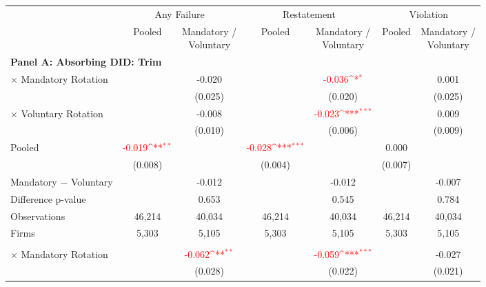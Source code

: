 \documentclass[10pt]{article}
\newcommand{\sym}[1]{\textsuperscript{#1}}
\begin{document}
\begin{minipage}{19cm}\fontsize{10}{12}\selectfont\setlength{\tabcolsep}{4pt}\renewcommand{\arraystretch}{1.12}


\def\sym#1{\ifmmode^{#1}\else\(^{#1}\)\fi}
\centering
{}
\label{tab:absorbing-transition-akm-restatement-good-downgrade-no-auditfirm-fe}
\begin{threeparttable}

\begin{tabular}{l cc cc cc}
\toprule
 & \multicolumn{2}{c}{Any Failure} & \multicolumn{2}{c}{Restatement} & \multicolumn{2}{c}{Violation} \\
\cmidrule(lr){2-3}\cmidrule(lr){4-5}\cmidrule(lr){6-7}
 & Pooled & \shortstack{Mandatory /\\Voluntary} & Pooled & \shortstack{Mandatory /\\Voluntary} & Pooled & \shortstack{Mandatory /\\Voluntary} \\
\midrule
\multicolumn{7}{l}{\textbf{Panel A: Absorbing DID: Trim}} \\
$\times$ Mandatory Rotation &  & -0.020 &  & \textcolor{red}{-0.036\sym{*}} &  & 0.001 \\
 &  & (0.025) &  & (0.020) &  & (0.025) \\
$\times$ Voluntary Rotation &  & -0.008 &  & \textcolor{red}{-0.023\sym{***}} &  & 0.009 \\
 &  & (0.010) &  & (0.006) &  & (0.009) \\
Pooled & \textcolor{red}{-0.019\sym{**}} &  & \textcolor{red}{-0.028\sym{***}} &  & 0.000 &  \\
 & (0.008) &  & (0.004) &  & (0.007) &  \\
Mandatory $-$ Voluntary &  & -0.012 &  & -0.012 &  & -0.007 \\
Difference p-value &  & 0.653 &  & 0.545 &  & 0.784 \\
Observations & 46,214 & 40,034 & 46,214 & 40,034 & 46,214 & 40,034 \\
Firms & 5,303 & 5,105 & 5,303 & 5,105 & 5,303 & 5,105 \\
\addlinespace
\multicolumn{7}{l}{\textbf{Panel B: Absorbing DID: Strict}} \\
$\times$ Mandatory Rotation &  & \textcolor{red}{-0.062\sym{**}} &  & \textcolor{red}{-0.059\sym{***}} &  & -0.027 \\
 &  & (0.028) &  & (0.022) &  & (0.021) \\

\end{tabular}
\end{threeparttable}
\end{minipage}
\end{document}
